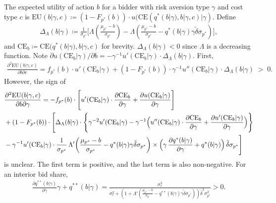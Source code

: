 \documentclass[12pt]{article}
\theoremstyle{definition} %
\begin{document}
The expected utility of action $b $ for a bidder with risk aversion type $\gamma$ and cost type $c$ is $\mathrm{EU}(b|\gamma,c) \coloneqq (1-F_{p^\ast}(b)) \cdot u(\mathrm{CE}(q^\ast(b|\gamma),b|\gamma,c)|\gamma) $. Define
\begin{align*}
\Delta_\Lambda(b|\gamma)
\coloneqq \frac{1}{\sigma_{p^\ast}} \Biggl[
\Lambda\!\left(\frac{\mu_{p^\ast}-b}{\sigma_{p^\ast}}\right)
-\Lambda\!\left(\frac{\mu_{p^\ast}-b}{\sigma_{p^\ast}}
- q^\ast(b|\gamma)\gamma \tilde{\delta}\sigma_{p^\ast}\right)
\Biggr],
\end{align*}
and $\mathrm{CE}_b \coloneqq \mathrm{CE}(q^\ast(b|\gamma),b|\gamma,c)$ for brevity. $\Delta_\Lambda(b|\gamma) < 0$ since $\Lambda $ is a decreasing function. Note $\partial u(\mathrm{CE}_b|\gamma)/\partial b = -\gamma^{-1} u'(\mathrm{CE}_b|\gamma)\cdot \Delta_\Lambda(b|\gamma) $. First,
\begin{align*}
\frac{\partial^2 \mathrm{EU}(b|\gamma,c)}{\partial b \partial c}
= f_{p^\ast}(b)\cdot u'(\mathrm{CE}_b|\gamma) + (1-F_{p^\ast}(b))\cdot \gamma^{-1}
u''(\mathrm{CE}_b|\gamma)\cdot \Delta_\Lambda(b|\gamma)
\;>\; 0.
\end{align*}
However, the sign of
\begin{align*}
&\frac{\partial^2 \mathrm{EU}(b|\gamma,c)}{\partial b \partial \gamma}
= - f_{p^\ast}(b)\cdot
\Biggl[
u'(\mathrm{CE}_b|\gamma)\cdot \frac{\partial \mathrm{CE}_b}{\partial \gamma}
+ \frac{\partial u(\mathrm{CE}_b|\gamma)}{\partial \gamma}
\Biggr] \\
&+ (1-F_{p^\ast}(b))\cdot
\Biggl[
\Delta_\Lambda(b|\gamma)\cdot
\Biggl\{
\gamma^{-2}u'(\mathrm{CE}_b|\gamma)
- \gamma^{-1}\Bigl(
u''(\mathrm{CE}_b|\gamma)\cdot \frac{\partial \mathrm{CE}_b}{\partial \gamma}
+ \frac{\partial u'(\mathrm{CE}_b|\gamma)}{\partial \gamma}
\Bigr)
\Biggr\} \\
&- \gamma^{-1}u'(\mathrm{CE}_b|\gamma)\cdot
\frac{1}{\sigma_{p^\ast}}\,
\Lambda'\!\left(
\frac{\mu_{p^\ast}-b}{\sigma_{p^\ast}}
- q^\ast(b|\gamma)\gamma \tilde{\delta}\sigma_{p^\ast}
\right) \times \Bigl(\gamma\,\frac{\partial q^\ast(b|\gamma)}{\partial \gamma}
+ q^\ast(b|\gamma)\Bigr)\,\tilde{\delta}\sigma_{p^\ast}
\Biggr]
\end{align*}
is unclear. The first term is positive, and the last term is also non-negative. For an interior bid share,
\begin{align*}
\frac{\partial q^{\ast\ast}(b|\gamma)}{\partial \gamma} \gamma + q^{\ast\ast}(b|\gamma) = \frac{\sigma_r^2}{\sigma_r^2 + \left(1+\Lambda'\left(\frac{\mu_{p^\ast} - b}{\sigma_{p^\ast}} - q^{\ast\ast}(b|\gamma) \gamma \tilde{\delta} \sigma_{p^\ast} \right)\right) \tilde{\delta}^2 \sigma_{p^\ast}^2 } > 0.
\end{align*}
\end{document}
